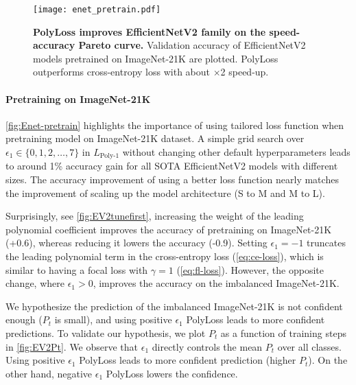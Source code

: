 \begin{wrapfigure}{r}{0.5\textwidth}
  \vspace{-20pt}
  \centering
  \texttt{[image: enet\_pretrain.pdf]}
    \vspace{-10pt}
  \caption{\textbf{PolyLoss improves EfficientNetV2 family on the speed-accuracy Pareto curve.} Validation accuracy of EfficientNetV2 models pretrained on ImageNet-21K are plotted. PolyLoss outperforms cross-entropy loss with about $\times$2 speed-up.}
  \label{fig:Enet-pretrain}
    \vspace{-15pt}
\end{wrapfigure}
\vspace{-10pt}
\paragraph{Pretraining on ImageNet-21K}\autoref{fig:Enet-pretrain} highlights the importance of using tailored loss function when pretraining model on ImageNet-21K dataset. A simple grid search over $\epsilon_1 \in \{0, 1, 2, \hdots, 7\}$ in $L_{\text{Poly-1}}$ without changing other default hyperparameters leads to around 1\% accuracy gain for all SOTA EfficientNetV2 models with different sizes.  The accuracy improvement of using a better loss function nearly matches the improvement of scaling up the model architecture (S to M and M to L). 

Surprisingly, see \autoref{fig:EV2tunefirst}, increasing the weight of the leading polynomial coefficient improves the accuracy of pretraining on ImageNet-21K (+0.6), whereas reducing it lowers the accuracy (-0.9). Setting $\epsilon_1 = -1$ truncates the leading polynomial term in the cross-entropy loss (\autoref{eq:ce-loss}), which is similar to having a focal loss with $\gamma=1$ (\autoref{eq:fl-loss}).
However, the opposite change, where $\epsilon_1 >0$, improves the accuracy on the imbalanced ImageNet-21K. 

We hypothesize the prediction of the imbalanced ImageNet-21K is not confident enough ($P_t$ is small), and using positive $\epsilon_1$ PolyLoss leads to more confident predictions. To validate our hypothesis, we plot $P_t$ as a function of training steps in \autoref{fig:EV2Pt}. We observe that $\epsilon_1$ directly controls the mean $P_t$ over all classes. Using positive $\epsilon_1$ PolyLoss leads to more confident prediction (higher $P_t$). On the other hand, negative $\epsilon_1$ PolyLoss lowers the confidence. 

